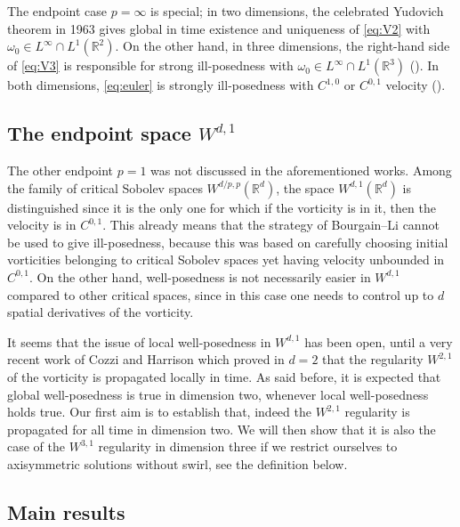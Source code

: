 \documentclass[11pt]{amsart}
\newcommand{\R}{{\mathbb R}}
\numberwithin{equation}{section}
\newcommand{\omg}{\omega}
\def\bbR{\mathbb{R}}
\begin{document}
The endpoint case $p = \infty$ is special; in two dimensions, the celebrated Yudovich theorem in 1963 \cite{Yudo} gives global in time existence and uniqueness of \eqref{eq:V2} with $\omg_{0} \in L^\infty \cap L^1(\bbR^2)$. On the other hand, in three dimensions, the right-hand side of \eqref{eq:V3} is responsible for strong ill-posedness with $\omg_{0} \in L^\infty \cap L^1(\bbR^3)$ (\cite{EM,JK}). In both dimensions, \eqref{eq:euler} is strongly ill-posedness with $C^{1,0}$ or $C^{0,1}$ velocity (\cite{BL2,EM,EJ2,JY}). 


    
\subsection{The endpoint space \texorpdfstring{$W^{d,1}$}{TEXT}}

The other endpoint $p = 1$ was not discussed in the aforementioned works. Among the family of critical Sobolev spaces $W^{d/p , p}(\R^d)$, the space $W^{d,1}(\R^d)$ is distinguished since it is the only one for which if the vorticity is in it, then 
the velocity is in  $C^{0,1}.$ This already means that the strategy of Bourgain--Li cannot be used to give ill-posedness, because this was based on carefully choosing initial vorticities belonging to critical Sobolev spaces yet having velocity unbounded in $C^{0,1}$. On the other hand, well-posedness is not necessarily easier in $W^{d,1}$ compared to other critical spaces, since in this case one needs to control up to $d$ spatial derivatives of the vorticity. 

It seems that the issue of local well-posedness in $W^{d,1}$ has been open, until a very recent work of Cozzi and Harrison \cite{CH} which proved in $d = 2$ that the regularity $W^{2,1}$ of the vorticity is propagated locally in time. As said before,  it is expected that global well-posedness is true in dimension two, whenever local well-posedness 
  holds true.  Our first aim is to establish that, indeed the 
   $W^{2,1}$ regularity is propagated for all time in dimension two. 
   We will  then show that it is also the case of the    $W^{3,1}$ regularity in dimension three
   if we restrict ourselves to  axisymmetric solutions  without swirl, see the definition below.  


\subsection{Main results}
\end{document}
